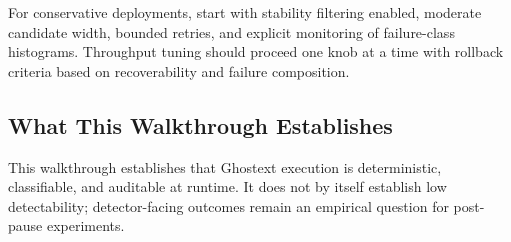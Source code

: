 For conservative deployments, start with stability filtering enabled, moderate candidate width, bounded retries, and explicit monitoring of failure-class histograms. Throughput tuning should proceed one knob at a time with rollback criteria based on recoverability and failure composition.

\subsection{What This Walkthrough Establishes}

This walkthrough establishes that Ghostext execution is deterministic, classifiable, and auditable at runtime. It does not by itself establish low detectability; detector-facing outcomes remain an empirical question for post-pause experiments.

